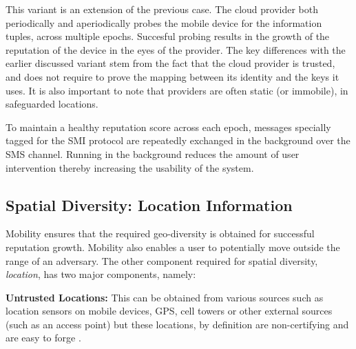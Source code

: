 \documentclass[letterpaper,twocolumn]{sig-alternate}
\begin{document}
\vspace{1mm}
 This variant is an extension of the previous case. The cloud provider both periodically and aperiodically probes the mobile device for the information tuples, across multiple epochs. Succesful probing results in the growth of the reputation of the device in the eyes of the provider. The key differences with the earlier discussed variant stem from the fact that the cloud provider is trusted, and does not require to prove the mapping between its identity and the keys it uses. It is also important to note that providers are often static (or immobile), in safeguarded locations.

\vspace{1mm}
To maintain a healthy reputation score across each epoch, messages specially tagged for the SMI protocol are repeatedly exchanged in the background over the SMS channel. Running in the background reduces the amount of user intervention thereby increasing the usability of the system. 

\subsection{Spatial Diversity: Location Information}
\label{location}

Mobility ensures that the required geo-diversity is obtained for successful reputation growth. Mobility also enables a user to potentially move outside the range of an adversary. The other component required for spatial diversity, {\em location}, has two major components, namely:

\textbf{Untrusted Locations:} 
This can be obtained from various sources such as location sensors on mobile devices, GPS, cell towers or other external sources (such as an access point) but these locations, by definition are non-certifying and are easy to forge \cite{tippenhauer2011requirements}. 
\end{document}
